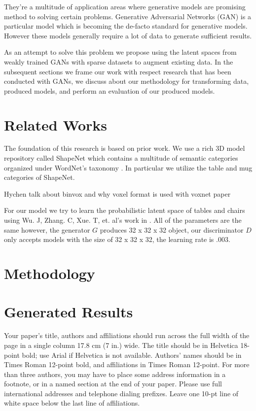 \documentclass{sigchi}
\begin{document}
They’re a multitude of application areas where generative models are promising method to solving certain problems. Generative Adversarial Networks (GAN) \cite{NIPS2014_5423} is a particular model  which is becoming the de-facto standard for generative models. However these models generally require a lot of data to generate sufficient results.

As an attempt to solve this problem we propose using the latent spaces from weakly trained GANs with sparse datasets to augment existing data. In the subsequent sections we frame our work with respect research that has been conducted with GANs, we discuss about our methodology for transforming data, produced models, and perform an evaluation of our produced models.

\section{Related Works}

The foundation of this research is based on prior work. We use a rich 3D model repository called ShapeNet \cite{shapenet2015} which contains a multitude of semantic categories organized under WordNet’s taxonomy \cite{Miller:1995:WLD:219717.219748}. In particular we utilize the table and mug categories of ShapeNet. 

Hychen talk about binvox and why voxel format is used with voxnet paper

For our model we try to learn the probabilistic latent space of tables and chairs using Wu. J, Zhang. C, Xue. T, et. al’s work in \cite{3dgan}. All of the parameters are the same however, the generator \(G\) produces 32 x 32 x 32 object, our discriminator  \(D\)only accepts models with the size of 32 x 32 x 32,  the learning rate is .003. 


\section{Methodology}

\section{Generated Results}

Your paper's title, authors and affiliations should run across the
full width of the page in a single column 17.8 cm (7 in.) wide.  The
title should be in Helvetica 18-point bold; use Arial if Helvetica is
not available.  Authors' names should be in Times Roman 12-point bold,
and affiliations in Times Roman 12-point.  For more than three authors,
you may have to place some address information in a footnote, or in a named
section at the end of your paper. Please use full international addresses and
telephone dialing prefixes.  Leave one 10-pt line of white space below the last
line of affiliations.
\end{document}
